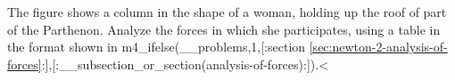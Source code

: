 The figure shows a column in the shape of a woman, holding
up the roof of part of the Parthenon. Analyze the forces in which she participates,
using a table in the format shown in m4_ifelse(__problems,1,[:section \ref{sec:newton-2-analysis-of-forces}:],[:__subsection_or_section(analysis-of-forces):]).<%
